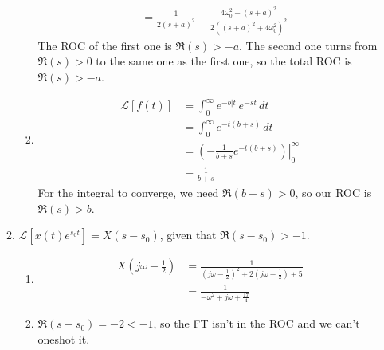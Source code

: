\documentclass[12pt]{article}
\newcommand{\lt}[1]{\mathcal{L}\left[#1\right]}
\begin{document}
\begin{enumerate}
\begin{enumerate}
\begin{enumerate}
\[\begin{aligned}
                                                 & = \boxed{\frac{1}{2(s+a)^2}-\frac{4\omega_0^2-(s+a)^2}{2\left((s+a)^2+4\omega_0^2\right)^2}}
                                          \end{aligned}\]
                                    The ROC of the first one is $\Re(s) > -a$.
                                    The second one turns from $\Re(s) > 0$ to the same one as the first one,
                                    so the total ROC is $\boxed{\Re(s) > -a}$.
                              \item \[\begin{aligned}
                                                \lt{f(t)}
                                                 & = \int_{0}^{\infty} e^{-b|t|}e^{-st}\,dt                       \\
                                                 & = \int_{0}^{\infty} e^{-t(b+s)}\,dt                            \\
                                                 & = \left.\left(-\frac{1}{b+s}e^{-t(b+s)}\right)\right|^\infty_0 \\
                                                 & = \boxed{\frac{1}{b+s}}
                                          \end{aligned}\]
                                    For the integral to converge, we need $\Re(b+s)>0$,
                                    so our ROC is $\boxed{\Re(s)>b}$.
                        \end{enumerate}
                  \item $\lt{x(t)e^{s_0t}}=X(s-s_0)$, given that $\Re(s-s_0)>-1$.
                        \begin{enumerate}
                              \item \[\begin{aligned}
                                                X\left(j\omega-\frac{1}{2}\right)
                                                 & = \frac{1}{\left(j\omega-\frac{1}{2}\right)^2+2\left(j\omega-\frac{1}{2}\right)+5} \\
                                                 & = \boxed{\frac{1}{-\omega^2+j\omega+\frac{17}{4}}}
                                          \end{aligned}\]
                              \item $\Re(s-s_0)=-2 < -1$, so the FT isn't in the ROC and we can't oneshot it.
                        \end{enumerate}

\end{enumerate}
\end{enumerate}
\end{document}
